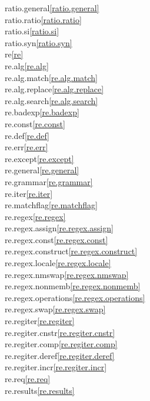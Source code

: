 \begin{multicols}{2}
ratio.general\quad\ref{ratio.general}\\
ratio.ratio\quad\ref{ratio.ratio}\\
ratio.si\quad\ref{ratio.si}\\
ratio.syn\quad\ref{ratio.syn}\\
re\quad\ref{re}\\
re.alg\quad\ref{re.alg}\\
re.alg.match\quad\ref{re.alg.match}\\
re.alg.replace\quad\ref{re.alg.replace}\\
re.alg.search\quad\ref{re.alg.search}\\
re.badexp\quad\ref{re.badexp}\\
re.const\quad\ref{re.const}\\
re.def\quad\ref{re.def}\\
re.err\quad\ref{re.err}\\
re.except\quad\ref{re.except}\\
re.general\quad\ref{re.general}\\
re.grammar\quad\ref{re.grammar}\\
re.iter\quad\ref{re.iter}\\
re.matchflag\quad\ref{re.matchflag}\\
re.regex\quad\ref{re.regex}\\
re.regex.assign\quad\ref{re.regex.assign}\\
re.regex.const\quad\ref{re.regex.const}\\
re.regex.construct\quad\ref{re.regex.construct}\\
re.regex.locale\quad\ref{re.regex.locale}\\
re.regex.nmswap\quad\ref{re.regex.nmswap}\\
re.regex.nonmemb\quad\ref{re.regex.nonmemb}\\
re.regex.operations\quad\ref{re.regex.operations}\\
re.regex.swap\quad\ref{re.regex.swap}\\
re.regiter\quad\ref{re.regiter}\\
re.regiter.cnstr\quad\ref{re.regiter.cnstr}\\
re.regiter.comp\quad\ref{re.regiter.comp}\\
re.regiter.deref\quad\ref{re.regiter.deref}\\
re.regiter.incr\quad\ref{re.regiter.incr}\\
re.req\quad\ref{re.req}\\
re.results\quad\ref{re.results}\\

\end{multicols}
